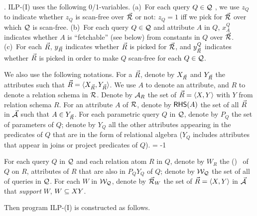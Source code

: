 . 
ILP-(I) uses the following 0/1-variables. 
(a)~For each query $Q\in \mathcal Q$ , we use $z_{Q}$ to indicate whether
$z_{Q}$ is scan-free over $\vec{{\mathcal R}}$ or not:
$z_{Q} = 1$ iff we pick \bss for $\vec{{\mathcal R}}$ over which $\mathcal Q$ is scan-free.
(b)~For each query $Q\in \mathcal Q$ and attribute $A$ in $Q$, 
$x_{A}^{Q}$ indicates whether $A$ is ``fetchable'' (see below)
from constants
in $Q$ over $\vec{{\mathcal R}}$. 
(c)~For each \bs $\vec{R}$, $y_{\vec{R}}$ indicates
whether $\vec{R}$ is picked for $\vec{{\mathcal R}}$, and $y^{Q}_{\vec{R}}$ 
indicates whether $\vec{R}$ is picked in order to make $Q$ scan-free
for each $Q\in \mathcal Q$.

\vspace{0.36ex}
We also use the following notations. For a \bs $\vec{R}$,
denote by $X_{\vec{R}}$ and $Y_{\vec{R}}$ the attributes such that
$\vec{R}\allowbreak =\allowbreak  \langle X_{\vec{R}},\allowbreak Y_{\vec{R}}\rangle$.
We use $A$ to denote an attribute, and $R$ to denote a
relation schema in ${\mathcal R}$.
Denote by ${\mathcal A}_{R}$ the set of \bss $\vec{R} \allowbreak = \allowbreak
\langle X,\allowbreak Y\rangle$ with $Y$ from relation schema $R$. For an
attribute $A$ of ${\mathcal R}$, denote by ${\mathsf{RHS}}(A)$ the set of all \bss
$\vec{R}$ in $\vec{{\mathcal A}}$ such that $A\in Y_{\vec{R}}$.
%
For each parametric query $Q$ in $\mathcal Q$, denote by $P_{Q}$ the set
of parameters of $Q$; denote by $Y_{Q}$ all the other
attributes appearing %
in the predicates of $Q$ that
are in the form of relational
algebra (\ie $Y_{Q}$ includes attributes that appear %
in joins or project predicates of $Q$). 
\looseness = -1

\vspace{0.36ex}
For each query $Q$ in %
$\mathcal Q$ and each relation atom $R$ in $Q$, denote by
$W_{R}$ the \qcs ()~\cite{blinkdb} of $Q$ on $R$, \ie
attributes of
$R$ that are also in $P_{Q}Y_{Q}$ of $Q$; denote by $\mathcal{W}_{\mathcal Q}$
the set of all \qcs of queries in $\mathcal Q$. For each \qcs $W$ in
$\mathcal{W}_{\mathcal Q}$, denote by $\vec{{\mathcal R}}_{W}$ the set of \bss $\vec{R}\allowbreak
=\allowbreak \langle X,\allowbreak Y\rangle$ in $\vec{{\mathcal A}}$ that {\em support} $W$, \ie
$W\allowbreak\subseteq\allowbreak XY$. 


\vspace{0.6ex}
Then program ILP-(I) is constructed as follows.

